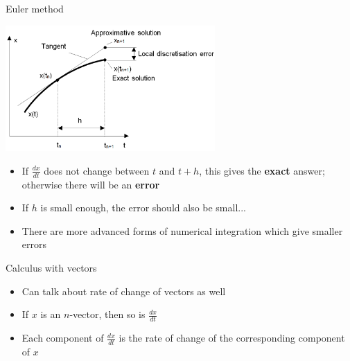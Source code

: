 \begin{frame}{Euler method}
	\begin{center}
		\includegraphics[width=0.6\textwidth]{euler_method}
	\end{center}
	\begin{itemize}
		\pause\item If $\frac{dx}{dt}$ does not change between $t$ and $t+h$, this gives the \textbf{exact} answer;
			otherwise there will be an \textbf{error}
		\pause\item If $h$ is small enough, the error should also be small...
		\pause\item There are more advanced forms of numerical integration which give smaller errors
	\end{itemize}
\end{frame}

\begin{frame}{Calculus with vectors}
	\begin{itemize}
		\pause\item Can talk about rate of change of vectors as well
		\pause\item If $x$ is an $n$-vector, then so is $\frac{dx}{dt}$
		\pause\item Each component of $\frac{dx}{dt}$ is the rate of change of the corresponding component of $x$
	\end{itemize}
\end{frame}
